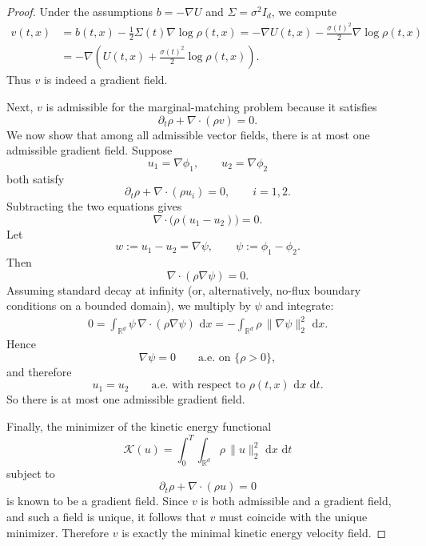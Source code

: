 \documentclass[oneside,11pt]{article}
\theoremstyle{remark}
\begin{document}
\begin{proof}
Under the assumptions \(b=-\nabla U\) and \(\Sigma=\sigma^2 I_d\), we compute
\begin{align*}
    v(t,x)
    &= b(t,x) - \frac12 \Sigma(t)\nabla \log \rho(t,x) = -\nabla U(t,x) - \frac{\sigma(t)^2}{2}\nabla \log \rho(t,x) \\
    &= -\nabla\!\left(U(t,x) + \frac{\sigma(t)^2}{2}\log \rho(t,x)\right).
\end{align*}
Thus \(v\) is indeed a gradient field.

Next, \(v\) is admissible for the marginal-matching problem because it satisfies
\begin{equation*}
    \partial_t \rho + \nabla\cdot(\rho v)=0.
\end{equation*}
We now show that among all admissible vector fields, there is at most one admissible gradient field. Suppose
\[
u_1 = \nabla \phi_1,
\qquad
u_2 = \nabla \phi_2
\]
both satisfy
\begin{equation*}
    \partial_t \rho + \nabla\cdot(\rho u_i)=0,
    \qquad i=1,2.
\end{equation*}
Subtracting the two equations gives
\begin{equation*}
    \nabla\cdot\bigl(\rho (u_1-u_2)\bigr)=0.
\end{equation*}
Let
\[
w := u_1-u_2 = \nabla \psi,
\qquad
\psi := \phi_1-\phi_2.
\]
Then
\begin{equation*}
    \nabla\cdot(\rho \nabla \psi)=0.
\end{equation*}
Assuming standard decay at infinity (or, alternatively, no-flux boundary conditions on a bounded domain), we multiply by \(\psi\) and integrate:
\begin{align*}
    0
    = \int_{\mathbb{R}^d} \psi \,\nabla\cdot(\rho \nabla \psi)\,\,\mathrm{d} x
    = - \int_{\mathbb{R}^d} \rho\, \lVert \nabla \psi \rVert_2^2 \,\,\mathrm{d} x.
\end{align*}
Hence
\[
\nabla \psi = 0
\qquad \text{a.e. on } \{\rho>0\},
\]
and therefore
\[
u_1=u_2
\qquad \text{a.e. with respect to } \rho(t,x)\,\,\mathrm{d} x\,\,\mathrm{d} t.
\]
So there is at most one admissible gradient field.

Finally, the minimizer of the kinetic energy functional
\[
\mathcal{K}(u)=\int_0^T \int_{\mathbb{R}^d} \rho\, \|u\|^2_2 \,\,\mathrm{d} x\,\,\mathrm{d} t
\]
subject to
\[
\partial_t\rho+\nabla\cdot(\rho u)=0
\]
is known to be a gradient field. Since \(v\) is both admissible and a gradient field, and such a field is unique, it follows that \(v\) must coincide with the unique minimizer. Therefore \(v\) is exactly the minimal kinetic energy velocity field.
\end{proof}
\end{document}
